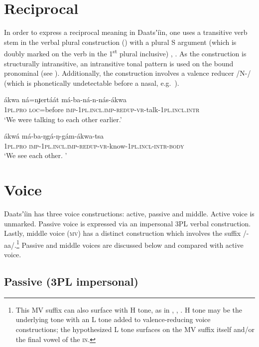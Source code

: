 \documentclass[output=paper]{langsci/langscibook}
\begin{document}
\section{Reciprocal}\label{sec:ahlandc:5}

In order to express a reciprocal meaning in Daatsʼíin, one uses a transitive verb stem in the verbal plural construction () with a plural S argument (which is doubly marked on the verb in the 1\textsuperscript{st} plural inclusive) , . As the construction is structurally intransitive, an intransitive tonal pattern is used on the bound pronominal (see ). Additionally, the construction involves a valence reducer /N-/ (which is phonetically undetectable before a nasal, e.g.\ ).

\ea\label{ex:ahlandc:43}
\gll
ákwa     ná=nɟertáát   má-ba-ná-n-nás-ákwa \\
1\textsc{pl.pro} \textsc{loc}=before     \textsc{imp-1pl.incl.imp}{}-\textsc{redup}{}-\textsc{vr}{}-talk-\textsc{1pl.incl.intr}\\
\glt
‘We were talking to each other earlier.’ 
\z

\ea\label{ex:ahlandc:44}
\gll
ákwá  má-ba-ŋgá-ŋ-gám-ákwa-tsa \\
1\textsc{pl.pro}   \textsc{imp-1pl.incl}.\textsc{imp}{}-\textsc{redup}{}-\textsc{vr-}know-\textsc{1pl.incl-intr-body} \\
\glt
 ‘We see each other. ’  
\z


\section{Voice}\label{sec:ahlandc:6}



Daatsʼíin has three voice constructions: active, passive and middle. Active voice is unmarked. Passive voice is expressed via an impersonal 3PL verbal construction. Lastly, middle voice (\textsc{mv}) has a distinct construction which involves the suffix /-aa/.\footnote{This MV suffix can also surface with H tone, as in , , . H tone may be the underlying tone with an L tone added to valence-reducing voice constructions; the hypothesized L tone surfaces on the MV suffix itself and/or the final vowel of the \textsc{in}.} Passive and middle voices are discussed below and compared with active voice.


\subsection{Passive (3PL impersonal)}\label{sec:ahlandc:6.1}
\end{document}
